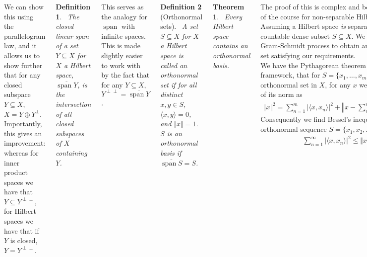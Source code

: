 \documentclass{tikzposter} %
\DeclareMathOperator{\Span}{span}
\newtheorem{theorem}{Theorem}
\newtheorem{definition}{Definition}
\begin{document}
\begin{columns}
{    We can show this using the parallelogram law, and it allows us to show further that for any closed subspace $Y \subseteq X$, $X = Y \oplus Y^{\perp}$. \\

    Importantly, this gives an improvement: whereas for inner product spaces we have that $Y \subseteq Y^{\perp \perp}$, for Hilbert spaces we have that if $Y$ is closed, $Y = Y^{\perp \perp}$. \\

    \begin{definition}
    \ The closed linear span of a set $Y \subseteq X$ for $X$ a Hilbert space, $\overline{\Span Y}$, is the intersection of all closed subspaces of $X$ containing $Y$.
    \end{definition}
    \hphantom{}

    This serves as the analogy for $\Span$ with infinite spaces. This is made slightly easier to work with by the fact that for any $Y \subseteq X$, $Y^{\perp \perp} = \overline{\Span Y}$. \\

    \begin{definition}[Orthonormal sets]
      \ A set $S \subseteq X$ for $X$ a Hilbert space is called an orthonormal set if for all distinct $x, y \in S$, $\langle x, y \rangle = 0$, and $\Vert x\Vert  = 1$. $S$ is an orthonormal basis if $\overline{\Span S} = S$.
    \end{definition}
    \hphantom{}

    \begin{theorem}
    \ Every Hilbert space contains an orthonormal basis.
    \end{theorem}
    \hphantom{}

    The proof of this is complex and beyond the scope of the course for non-separable Hilbert spaces. Assuming a Hilbert space \emph{is} separable, there is a countable dense subset $S \subseteq X$. We then apply the Gram-Schmidt process to obtain an orthonormal set satisfying our requirements. \\

    We have the Pythagorean theorem in this framework, that for $S = \{x_{1},\dots,x_{m}\}$ a finite orthonormal set in $X$, for any $x$ we get the square of its norm as
    \begin{align*}
      \Vert x \Vert^{2} = \sum_{n=1}^{m} |\langle x, x_{n} \rangle|^{2} + \left\Vert x - \sum_{n=1}^{m} \langle x , x_{n} \rangle x_{n} \right\Vert^{2}.
    \end{align*}
    Consequently we find Bessel's inequality for an orthonormal sequence $S = \{x_{1}, x_{2}, \dots\}$
    \begin{align*}
      \sum_{n=1}^{\infty} |\langle x, x_{n} \rangle|^{2} \le \Vert x \Vert ^{2}.
    \end{align*}

}
\end{columns}
\end{document}
